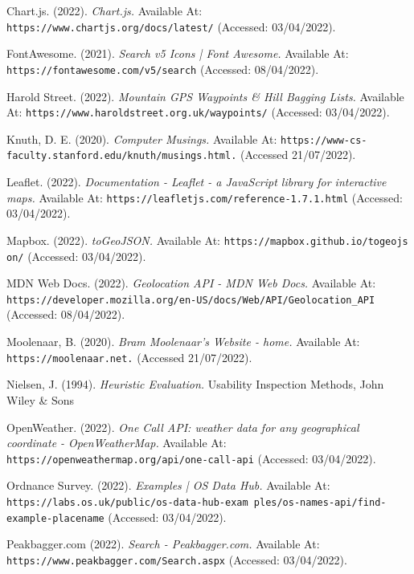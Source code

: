 \documentclass[11pt, english]{article}
\begin{document}
	\begin{thebibliography}{9}

	\bibitem{}
		Chart.js. (2022).
		\textsl{Chart.js.}
		Available At:
		\texttt{https://www.chartjs.org/docs/latest/}
		(Accessed: 03/04/2022).

	\bibitem{}
		FontAwesome. (2021).
		\textsl{Search v5 Icons | Font Awesome.}
		Available At:
		\texttt{https://fontawesome.com/v5/search}
		(Accessed: 08/04/2022).

	\bibitem{}
		Harold Street. (2022).
		\textsl{Mountain GPS Waypoints \& Hill Bagging Lists.}
		Available At:
		\texttt{https://www.haroldstreet.org.uk/waypoints/}
		(Accessed: 03/04/2022).

	\bibitem{}
		Knuth, D. E. (2020).
		\textsl{Computer Musings.}
		Available At:
		\texttt{https://www-cs-faculty.stanford.edu/knuth/musings.html.}
		(Accessed 21/07/2022).

	\bibitem{}
		Leaflet. (2022).
		\textsl{Documentation - Leaflet - a JavaScript library for interactive maps.}
		Available At:
		\texttt{https://leafletjs.com/reference-1.7.1.html}
		(Accessed: 03/04/2022).

	\bibitem{}
		Mapbox. (2022).
		\textsl{toGeoJSON.}
		Available At:
		\texttt{https://mapbox.github.io/togeojs on/}
		(Accessed: 03/04/2022).

	\bibitem{}
		MDN Web Docs. (2022).
		\textsl{Geolocation API - MDN Web Docs.}
		Available At:
		\texttt{https://developer.mozilla.org/en-US/docs/Web/API/Geolocation\_API}
		(Accessed: 08/04/2022).

	\bibitem{}
		Moolenaar, B. (2020).
		\textsl{Bram Moolenaar's Website - home.}
		Available At:
		\texttt{https://moolenaar.net.}
		(Accessed 21/07/2022).

	\bibitem{}
		Nielsen, J. (1994).
		\textsl{Heuristic Evaluation.}
		Usability Inspection Methods, John Wiley \& Sons

	\bibitem{}
		OpenWeather. (2022).
		\textsl{One Call API: weather data for any geographical coordinate - OpenWeatherMap.}
		Available At:
		\texttt{https://openweathermap.org/api/one-call-api}
		(Accessed: 03/04/2022).

	\bibitem{}
		Ordnance Survey. (2022).
		\textsl{Examples | OS Data Hub.}
		Available At:
		\texttt{https://labs.os.uk/public/os-data-hub-exam ples/os-names-api/find-example-placename}
		(Accessed: 03/04/2022).

	\bibitem{}
		Peakbagger.com (2022).
		\textsl{Search - Peakbagger.com.}
		Available At:
		\texttt{https://www.peakbagger.com/Search.aspx}
		(Accessed: 03/04/2022).


\end{thebibliography}
\end{document}
